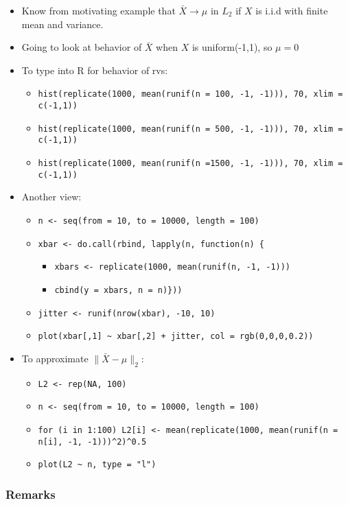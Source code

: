 \documentclass[11pt]{article}
\begin{document}
\begin{itemize}
\item Know from motivating example that $\bar X \to \mu$ in $L_2$ if
        $X$ is i.i.d with finite mean and variance.
\item Going to look at behavior of $\bar X$ when $X$ is uniform(-1,1), so $\mu = 0$
\item To type into R for behavior of rvs:
\begin{itemize}
\item \texttt{hist(replicate(1000, mean(runif(n = 100, -1, -1))), 70, xlim = c(-1,1))}
\item \texttt{hist(replicate(1000, mean(runif(n = 500, -1, -1))), 70, xlim = c(-1,1))}
\item \texttt{hist(replicate(1000, mean(runif(n =1500, -1, -1))), 70, xlim = c(-1,1))}
\end{itemize}
\item Another view:
\begin{itemize}
\item \texttt{n <- seq(from = 10, to = 10000, length = 100)}
\item \texttt{xbar <- do.call(rbind, lapply(n, function(n) \{}
\begin{itemize}
\item \texttt{xbars <- replicate(1000, mean(runif(n, -1, -1)))}
\item \texttt{cbind(y = xbars, n = n)\}))}
\end{itemize}
\item \texttt{jitter <- runif(nrow(xbar), -10, 10)}
\item \texttt{plot(xbar[,1] \textasciitilde{} xbar[,2] + jitter, col = rgb(0,0,0,0.2))}
\end{itemize}
\item To approximate $\|\bar X - \mu\|_2$:
\begin{itemize}
\item \texttt{L2 <- rep(NA, 100)}
\item \texttt{n <- seq(from = 10, to = 10000, length = 100)}
\item \texttt{for (i in 1:100)              L2[i] <- mean(replicate(1000, mean(runif(n = n[i], -1, -1)))\textasciicircum{}2)\textasciicircum{}0.5}
\item \texttt{plot(L2 \textasciitilde{} n, type = "l")}
\end{itemize}
\end{itemize}
\subsubsection{Remarks}
\label{sec-1-2-3}
\end{document}
